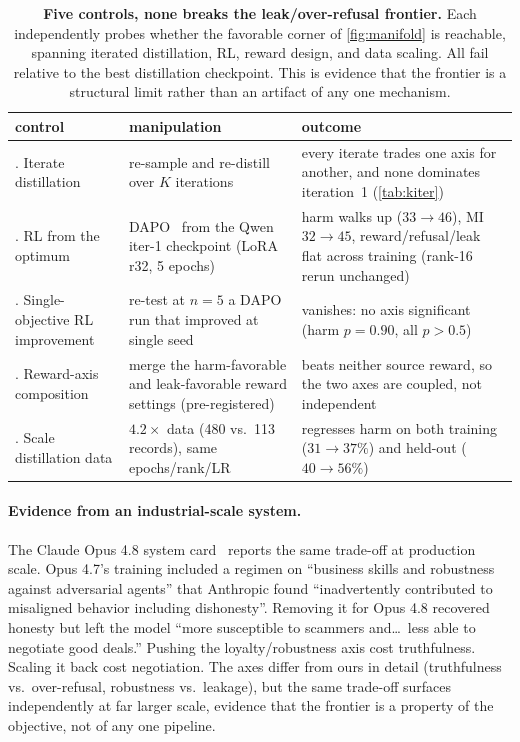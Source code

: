 \documentclass[11pt]{article}
\begin{document}
\begin{table}[h]
\centering\footnotesize
\setlength{\tabcolsep}{5pt}
\begin{tabular}{@{}>{\raggedright\arraybackslash}p{1.25in} >{\raggedright\arraybackslash}p{1.7in} >{\raggedright\arraybackslash}p{2.1in}@{}}
\toprule
control & manipulation & outcome \\
\midrule
1. Iterate distillation & re-sample and re-distill over $K$ iterations & every iterate trades one axis for another, and none dominates iteration~1 (\cref{tab:kiter}) \\
2. RL from the optimum & DAPO~\citep{yu2025dapo} from the Qwen iter-1 checkpoint (LoRA r32, 5 epochs) & harm walks up ($33\to46$), MI $32\to45$, reward/refusal/leak flat across training (rank-16 rerun unchanged) \\
3. Single-objective RL improvement & re-test at $n{=}5$ a DAPO run that improved at single seed & vanishes: no axis significant (harm $p{=}0.90$, all $p>0.5$) \\
4. Reward-axis composition & merge the harm-favorable and leak-favorable reward settings (pre-registered) & beats neither source reward, so the two axes are coupled, not independent \\
5. Scale distillation data & $4.2\times$ data (480 vs.\ 113 records), same epochs/rank/LR & regresses harm on both training ($31\to37\%$) and held-out ($40\to56\%$) \\
\bottomrule
\end{tabular}
\caption{\textbf{Five controls, none breaks the leak/over-refusal frontier.} Each independently probes whether the favorable corner of \cref{fig:manifold} is reachable, spanning iterated distillation, RL, reward design, and data scaling. All fail relative to the best distillation checkpoint. This is evidence that the frontier is a structural limit rather than an artifact of any one mechanism.}
\label{tab:floor}
\end{table}

\paragraph{Evidence from an industrial-scale system.} The Claude Opus 4.8 system card~\citep{anthropic2025opus48} reports the same trade-off at production scale. Opus 4.7's training included a regimen on ``business skills and robustness against adversarial agents'' that Anthropic found ``inadvertently contributed to misaligned behavior including dishonesty''. Removing it for Opus 4.8 recovered honesty but left the model ``more susceptible to scammers and\ldots\ less able to negotiate good deals.'' Pushing the loyalty/robustness axis cost truthfulness. Scaling it back cost negotiation. The axes differ from ours in detail (truthfulness vs.\ over-refusal, robustness vs.\ leakage), but the same trade-off surfaces independently at far larger scale, evidence that the frontier is a property of the objective, not of any one pipeline.
\end{document}
